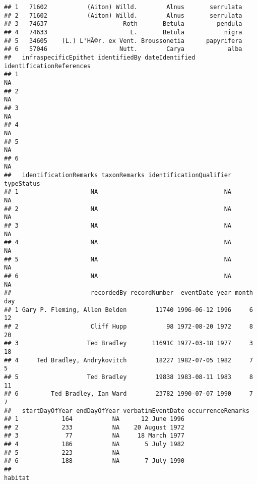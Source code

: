 \documentclass[
]{article}
\begin{document}
\begin{verbatim}
## 1   71602           (Aiton) Willd.        Alnus       serrulata          
## 2   71602           (Aiton) Willd.        Alnus       serrulata          
## 3   74637                     Roth       Betula         pendula          
## 4   74633                       L.       Betula           nigra          
## 5   34605    (L.) L'HÃ©r. ex Vent. Broussonetia      papyrifera          
## 6   57046                    Nutt.        Carya            alba          
##   infraspecificEpithet identifiedBy dateIdentified identificationReferences
## 1                                                                        NA
## 2                                                                        NA
## 3                                                                        NA
## 4                                                                        NA
## 5                                                                        NA
## 6                                                                        NA
##   identificationRemarks taxonRemarks identificationQualifier typeStatus
## 1                    NA                                   NA         NA
## 2                    NA                                   NA         NA
## 3                    NA                                   NA         NA
## 4                    NA                                   NA         NA
## 5                    NA                                   NA         NA
## 6                    NA                                   NA         NA
##                      recordedBy recordNumber  eventDate year month day
## 1 Gary P. Fleming, Allen Belden        11740 1996-06-12 1996     6  12
## 2                    Cliff Hupp           98 1972-08-20 1972     8  20
## 3                   Ted Bradley       11691C 1977-03-18 1977     3  18
## 4     Ted Bradley, Andrykovitch        18227 1982-07-05 1982     7   5
## 5                   Ted Bradley        19838 1983-08-11 1983     8  11
## 6         Ted Bradley, Ian Ward        23782 1990-07-07 1990     7   7
##   startDayOfYear endDayOfYear verbatimEventDate occurrenceRemarks
## 1            164           NA      12 June 1996                  
## 2            233           NA    20 August 1972                  
## 3             77           NA     18 March 1977                  
## 4            186           NA       5 July 1982                  
## 5            223           NA                                    
## 6            188           NA       7 July 1990                  
##                                                                                        habitat

\end{verbatim}
\end{document}
